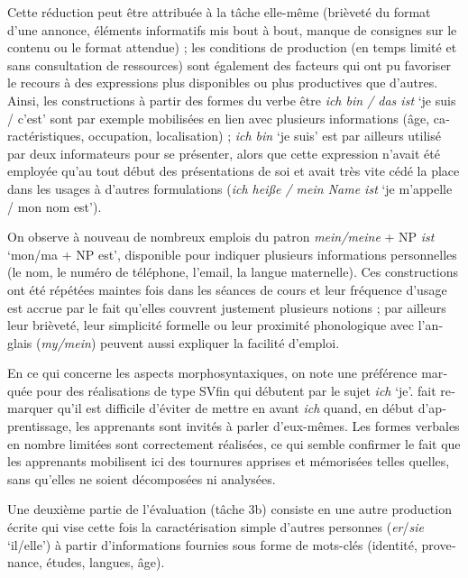 \documentclass[output=paper]{langscibook}
\begin{document}
\begin{otherlanguage}{french}
Cette réduction peut être attribuée à la tâche elle-même (brièveté du format d’une annonce, éléments informatifs mis bout à bout, manque de consignes sur le contenu ou le format attendue) ; les conditions de production (en temps limité et sans consultation de ressources) sont également des facteurs qui ont pu favoriser le recours à des expressions plus disponibles ou plus productives que d’autres. Ainsi, les constructions à partir des formes du verbe être \textit{ich bin / das ist} `je suis / c’est' sont par exemple mobilisées en lien avec plusieurs informations (âge, caractéristiques, occupation, localisation) ; \textit{ich bin} `je suis' est par ailleurs utilisé par deux informateurs pour se présenter, alors que cette expression n’avait été employée qu’au tout début des présentations de soi et avait très vite cédé la place dans les usages à d’autres formulations (\textit{ich heiße / mein Name ist} `je m’appelle / mon nom est').\largerpage

On observe à nouveau de nombreux emplois du patron \textit{mein/meine} + NP \textit{ist} `mon/ma + NP est', disponible pour indiquer plusieurs informations personnelles (le nom, le numéro de téléphone, l’email, la langue maternelle). Ces constructions ont été répétées maintes fois dans les séances de cours et leur fréquence d’usage est accrue par le fait qu’elles couvrent justement plusieurs notions ; par ailleurs leur brièveté, leur simplicité formelle ou leur proximité phonologique avec l’anglais (\textit{my/mein}) peuvent aussi expliquer la facilité d’emploi.

\begin{sloppypar}
En ce qui concerne les aspects morphosyntaxiques, on note une préférence marquée pour des réalisations de type SVfin qui débutent par le sujet \textit{ich} `je'. \citet{Winkler2017} fait remarquer qu’il est difficile d’éviter de mettre en avant \textit{ich} quand, en début d’apprentissage, les apprenants sont invités à parler d’eux-mêmes. Les formes verbales en nombre limitées sont correctement réalisées, ce qui semble confirmer le fait que les apprenants mobilisent ici des tournures apprises et mémorisées telles quelles, sans qu’elles ne soient décomposées ni analysées.
\end{sloppypar}

Une deuxième partie de l’évaluation (tâche 3b) consiste en une autre production écrite qui vise cette fois la caractérisation simple d’autres personnes (\textit{er}/\textit{sie} `il/elle') à partir d’informations fournies sous forme de mots-clés (identité, provenance, études, langues, âge).


\end{otherlanguage}
\end{document}
